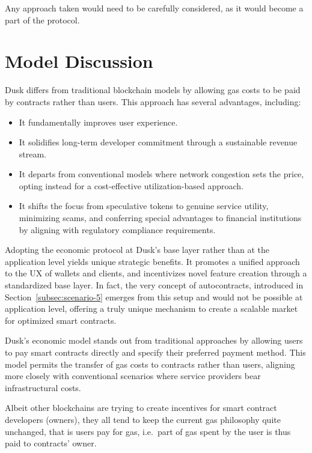 \documentclass[twocolumn, nofootinbib]{revtex4-2} %
\begin{document}
    Any approach taken would need to be carefully considered, as it would
    become a part of the protocol.

    \section*{Model Discussion}\label{sec:discussion}
    Dusk differs from traditional blockchain models by allowing gas costs to be
    paid by contracts rather than users.
    This approach has several advantages, including:

    \begin{itemize}
        \item It fundamentally improves user experience.
        \item It solidifies long-term developer commitment through a sustainable
              revenue stream.
        \item It departs from conventional models where network congestion sets
              the price, opting instead for a cost-effective utilization-based
              approach.
        \item It shifts the focus from speculative tokens to genuine service
              utility, minimizing scams, and conferring special advantages to
              financial institutions by aligning with regulatory compliance
              requirements.
    \end{itemize}

    Adopting the economic protocol at Dusk's base layer rather than at the
    application level yields unique strategic benefits.
    It promotes a unified approach to the UX of wallets and clients, and
    incentivizes novel feature creation through a standardized base layer.
    In fact, the very concept of autocontracts, introduced in Section~\ref{subsec:scenario-5}
    emerges from this setup and would not be possible at application level,
    offering a truly unique mechanism to create a scalable market for optimized
    smart contracts.

    Dusk's economic model stands out from traditional approaches by allowing
    users to pay smart contracts directly and specify their preferred payment
    method.
    This model permits the transfer of gas costs to contracts rather than users,
    aligning more closely with conventional scenarios where service providers
    bear infrastructural costs.

    Albeit other blockchains are trying to create incentives for smart contract
    developers (owners), they all tend to keep the current gas philosophy quite
    unchanged, that is users pay for gas, i.e.\ part of gas spent by the user is
    thus paid to contracts' owner.
\end{document}
